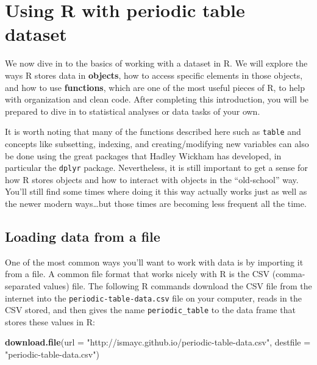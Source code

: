 \documentclass[]{tufte-book}
\newenvironment{Shaded}{\begin{snugshade}}{\end{snugshade}}
\newcommand{\DataTypeTok}[1]{\textcolor[rgb]{0.13,0.29,0.53}{#1}}
\newcommand{\KeywordTok}[1]{\textcolor[rgb]{0.13,0.29,0.53}{\textbf{#1}}}
\newcommand{\NormalTok}[1]{#1}
\newcommand{\StringTok}[1]{\textcolor[rgb]{0.31,0.60,0.02}{#1}}
\begin{document}
\hypertarget{using-r-with-periodic-table-dataset}{%
\section{Using R with periodic table dataset}\label{using-r-with-periodic-table-dataset}}

We now dive in to the basics of working with a dataset in R. We will explore the ways R stores data in \textbf{objects}, how to access specific elements in those objects, and how to use \textbf{functions}, which are one of the most useful pieces of R, to help with organization and clean code. After completing this introduction, you will be prepared to dive in to statistical analyses or data tasks of your own.

It is worth noting that many of the functions described here such as \texttt{table} and concepts like subsetting, indexing, and creating/modifying new variables can also be done using the great packages that Hadley Wickham has developed, in particular the \texttt{dplyr} package. Nevertheless, it is still important to get a sense for how R stores objects and how to interact with objects in the ``old-school'' way. You'll still find some times where doing it this way actually works just as well as the newer modern ways\ldots{}but those times are becoming less frequent all the time.

\hypertarget{loading-data-from-a-file}{%
\subsection{Loading data from a file}\label{loading-data-from-a-file}}

One of the most common ways you'll want to work with data is by importing it from a file. A common file format that works nicely with R is the CSV (comma-separated values) file. The following R commands download the CSV file from the internet into the \texttt{periodic-table-data.csv} file on your computer, reads in the CSV stored, and then gives the name \texttt{periodic\_table} to the data frame that stores these values in R:

\begin{Shaded}
\begin{Highlighting}[]
\KeywordTok{download.file}\NormalTok{(}\DataTypeTok{url =} \StringTok{"http://ismayc.github.io/periodic-table-data.csv"}\NormalTok{,}
 \DataTypeTok{destfile =} \StringTok{"periodic-table-data.csv"}\NormalTok{)}
\end{Highlighting}
\end{Shaded}
\end{document}
